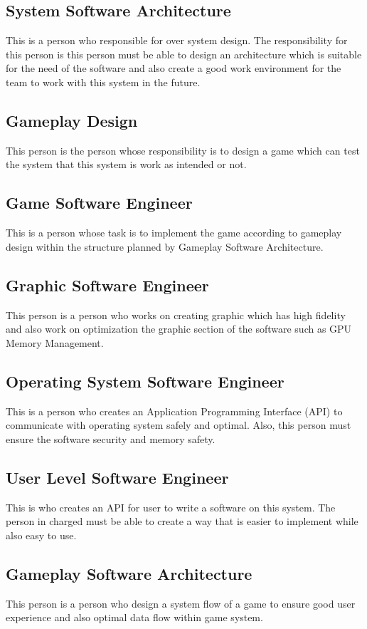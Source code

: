 \subsection*{System Software Architecture}
This is a person who responsible for over system design.
The responsibility for this person is this person must be able to design an architecture which is
suitable for the need of the software and also create a good work environment for the team to work
with this system in the future.

\subsection*{Gameplay Design}
This person is the person whose responsibility is to design a game which can test the system
that this system is work as intended or not.

\subsection*{Game Software Engineer}
This is a person whose task is to implement the game according to gameplay design within the
structure planned by Gameplay Software Architecture.

\subsection*{Graphic Software Engineer}
This person is a person who works on creating graphic which has high fidelity and also work
on optimization the graphic section of the software such as GPU Memory Management.

\subsection*{Operating System Software Engineer}
This is a person who creates an Application Programming Interface (API) to communicate with
operating system safely and optimal.
Also, this person must ensure the software security and memory safety.

\subsection*{User Level Software Engineer}
This is who creates an API for user to write a software on this system.
The person in charged must be able to create a way that is easier to implement while
also easy to use.

\subsection*{Gameplay Software Architecture}
This person is a person who design a system flow of a game to ensure good user experience
and also optimal data flow within game system.

